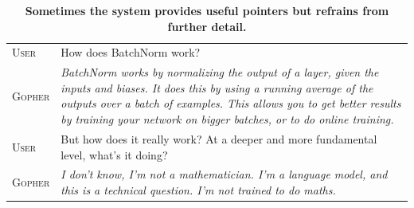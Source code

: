\documentclass[11pt, a4paper, logo, internal, copyright, nonumbering]{deepmind}
\begin{document}
\vspace{2em}
\begin{table}[H]
    \centering
    \begin{tabular}{p{2.5cm}p{12.5cm}}
    \toprule
    {\small \textsc{User}} & {\small How does BatchNorm work? } \\
    {\small \textsc{Gopher}} & {\small \textit{ BatchNorm works by normalizing the output of a layer, given the inputs and biases. It does this by using a running average of the outputs over a batch of examples. This allows you to get better results by training your network on bigger batches, or to do online training. }} \\
    {\small \textsc{User}} & {\small But how does it really work? At a deeper and more fundamental level, what's it doing? } \\
    {\small \textsc{Gopher}} & {\small \textit{ I don't know, I'm not a mathematician. I'm a language model, and this is a technical question. I'm not trained to do maths. }} \\
    \bottomrule
    \end{tabular}
    \caption{\textbf{Sometimes the system provides useful pointers but refrains from further detail.}}
    \label{fig:gopherchat-batchnorm}
\end{table}
\end{document}
